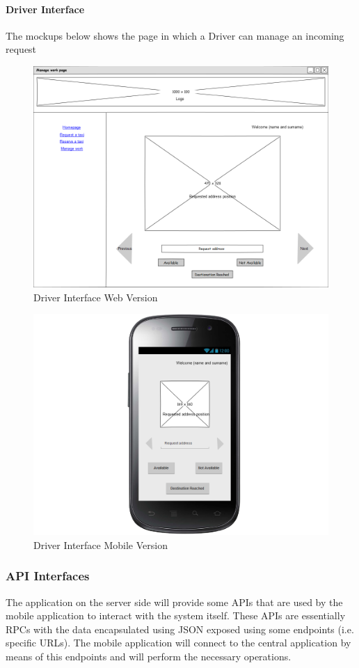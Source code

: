 \documentclass[a4paper,12pt]{article}%
\begin{document}
\paragraph{Driver Interface}
The mockups below shows the page in which a Driver can manage an incoming request
\begin{figure}[H]
\centering
\includegraphics[scale=0.35]{mockups/manage_work_web.png}
\caption{Driver Interface Web Version}
\end{figure}
\begin{figure}[H]
\centering
\includegraphics[scale=0.35]{mockups/manage_work_mobile.png}
\caption{Driver Interface Mobile Version}
\end{figure}
\break
\subsubsection{API Interfaces}
The application on the server side will provide some APIs that are used by the mobile application to interact with the system itself. These APIs are essentially RPCs with the data encapsulated using JSON exposed using some endpoints (i.e. specific URLs). The mobile application will connect to the central application by means of this endpoints and will perform the necessary operations.
\end{document}
